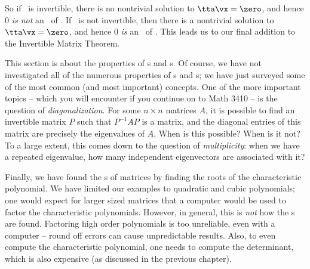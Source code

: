 So if \tta\ is invertible, there is no nontrivial solution to $\tta\vx=\zero$, and hence 0 \textit{is not} an \el\ of \tta. If \tta\ is not invertible, then there is a nontrivial solution to $\tta\vx=\zero$, and hence 0 \textit{is} an \el\ of \tta. This leads us to our final addition to the Invertible Matrix Theorem.

\smallskip


\smallskip


This section is about the properties of \el s and \ev s. Of course, we have not investigated all of the numerous properties of \el s and \ev s; we have just surveyed some of the most common (and most important) concepts. One of the more important topics -- which you will encounter if you continue on to Math 3410 -- is the question of \textit{diagonalization}. For some $n\times n$ matrices $A$, it is possible to find an invertible matrix $P$ such that $P^{-1}AP$ is a  matrix, and the diagonal entries of this matrix are precisely the eigenvalues of $A$. When is this possible? When is it not? To a large extent, this comes down to the question of \textit{multiplicity}: when we have a repeated eigenvalue, how many independent eigenvectors are associated with it?

Finally, we have found the \el s of matrices by finding the roots of the characteristic polynomial. We have limited our examples to quadratic and cubic polynomials; one would expect for larger sized matrices that a computer would be used to factor the characteristic polynomials. However, in general, this is \textit{not} how the \el s are found. Factoring high order polynomials is too unreliable, even with a computer -- round off errors can cause unpredictable results. Also, to even compute the characteristic polynomial, one needs to compute the determinant, which is also expensive (as discussed in the previous chapter). 

